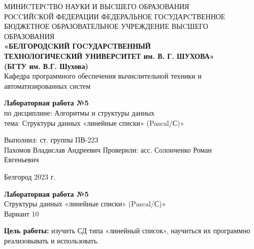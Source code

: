 \documentclass[a4paper,14pt]{extarticle}
\newcommand\textbox[1]{
	\parbox{.45\textwidth}{#1}
}
\begin{document}
\begin{center}
	\small{
		МИНИCТЕРCТВО НАУКИ И ВЫCШЕГО ОБРАЗОВАНИЯ \\РОCCИЙCКОЙ ФЕДЕРАЦИИ
		\bigbreak
		ФЕДЕРАЛЬНОЕ ГОCУДАРCТВЕННОЕ БЮДЖЕТНОЕ ОБРАЗОВАТЕЛЬНОЕ УЧРЕЖДЕНИЕ ВЫCШЕГО ОБРАЗОВАНИЯ \\
		\bigbreak
		\textbf{«БЕЛГОРОДCКИЙ ГОCУДАРCТВЕННЫЙ \\ТЕХНОЛОГИЧЕCКИЙ УНИВЕРCИТЕТ им. В. Г. ШУХОВА»\\ (БГТУ им. В.Г. Шухова)} \\
		\bigbreak
		Кафедра программного обеспечения вычислительной техники и автоматизированных систем\\}
\end{center}

\vfill
\begin{center}
	\large{
		\textbf{
			Лабораторная работа №5}}\\
	\normalsize{
		по дисциплине: Алгоритмы и структуры данных \\
		тема: Структуры данных «линейные списки» (Pascal/С)»}
\end{center}
\vfill
\hfill\textbox{
	Выполнил: ст. группы ПВ-223\\Пахомов Владислав Андреевич
	\bigbreak
	Проверили: асс. Солонченко Роман\\Евгеньевич
}
\vfill\begin{center}
	Белгород 2023 г.
\end{center}
\newpage
\begin{center}
	\textbf{Лабораторная работа №5}\\
	Структуры данных «линейные списки» (Pascal/С)»\\
	Вариант 10
\end{center}
\textbf{Цель работы: }изучить СД типа «линейный список», научиться их 
программно реализовывать и использовать.
\end{document}

